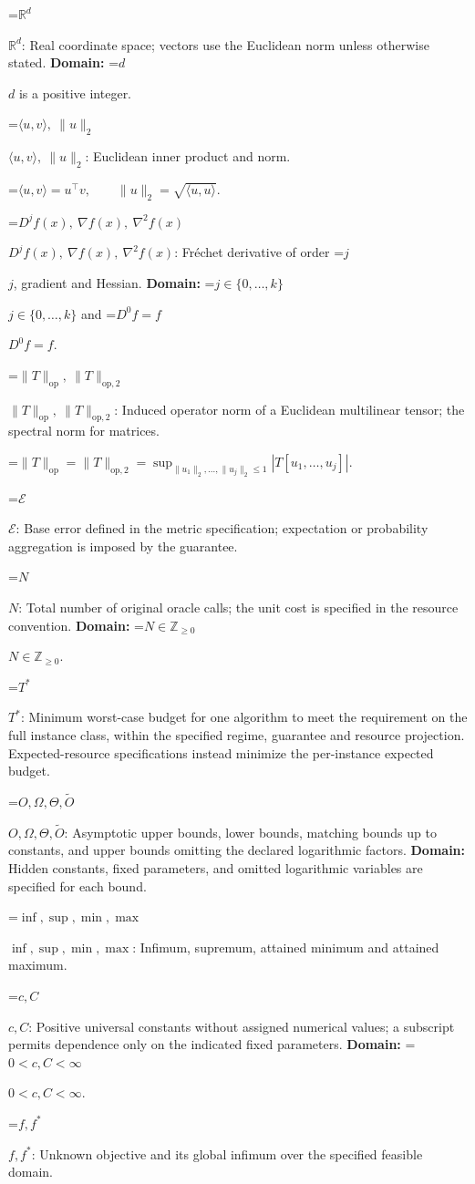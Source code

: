 \documentclass[10pt,a4paper]{article}
\newcommand{\AtlasMath}[1]{\par\begingroup\centering\setbox0=\hbox{$\displaystyle #1$}\ifdim\wd0>1.4\linewidth\typeout{ATLAS WIDE FORMULA: \the\wd0}\fi\ifdim\wd0>\linewidth\resizebox{\linewidth}{!}{\box0}\else\box0\fi\par\endgroup}
\newcommand{\AtlasInlineMath}[1]{\begingroup\setbox0=\hbox{$#1$}\ifdim\wd0>.4\linewidth\endgroup\AtlasMath{#1}\else\endgroup$#1$\fi}
\begin{document}
\AtlasInlineMath{\mathbb{R}^d}: Real coordinate space; vectors use the Euclidean norm unless otherwise stated. \textbf{Domain:} \AtlasInlineMath{d} is a positive integer.

\AtlasInlineMath{\langle u,v\rangle,\ \|u\|_2}: Euclidean inner product and norm.


\AtlasMath{\langle u,v\rangle=u^\top v,\qquad\|u\|_2=\sqrt{\langle u,u\rangle}.}


\AtlasInlineMath{D^jf(x),\ \nabla f(x),\ \nabla^2f(x)}: Fréchet derivative of order \AtlasInlineMath{j}, gradient and Hessian. \textbf{Domain:} \AtlasInlineMath{j\in\{0,\ldots,k\}} and \AtlasInlineMath{D^0f=f}.

\AtlasInlineMath{\|T\|_{\mathrm{op}},\ \|T\|_{\mathrm{op},2}}: Induced operator norm of a Euclidean multilinear tensor; the spectral norm for matrices.


\AtlasMath{\|T\|_{\mathrm{op}}=\|T\|_{\mathrm{op},2}=\sup_{\|u_1\|_2,\ldots,\|u_j\|_2\le1}|T[u_1,\ldots,u_j]|.}


\AtlasInlineMath{\mathcal{E}}: Base error defined in the metric specification; expectation or probability aggregation is imposed by the guarantee.

\AtlasInlineMath{N}: Total number of original oracle calls; the unit cost is specified in the resource convention. \textbf{Domain:} \AtlasInlineMath{N\in\mathbb{Z}_{\ge0}}.

\AtlasInlineMath{T^*}: Minimum worst-case budget for one algorithm to meet the requirement on the full instance class, within the specified regime, guarantee and resource projection. Expected-resource specifications instead minimize the per-instance expected budget.

\AtlasInlineMath{O,\Omega,\Theta,\widetilde{O}}: Asymptotic upper bounds, lower bounds, matching bounds up to constants, and upper bounds omitting the declared logarithmic factors. \textbf{Domain:} Hidden constants, fixed parameters, and omitted logarithmic variables are specified for each bound.

\AtlasInlineMath{\inf,\sup,\min,\max}: Infimum, supremum, attained minimum and attained maximum.

\AtlasInlineMath{c,C}: Positive universal constants without assigned numerical values; a subscript permits dependence only on the indicated fixed parameters. \textbf{Domain:} \AtlasInlineMath{0<c,C<\infty}.

\AtlasInlineMath{f,f^*}: Unknown objective and its global infimum over the specified feasible domain.
\end{document}
